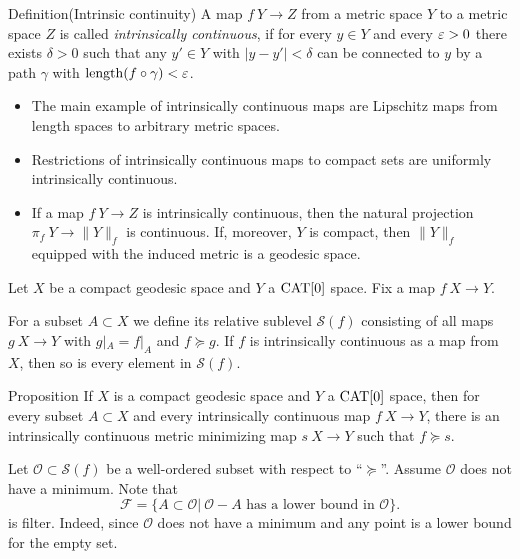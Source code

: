 \documentclass{article}
\begin{document}
\begin{thm}{Definition}(Intrinsic continuity)
A map $f\:Y\to Z$ from a metric space $Y$ to a metric space
 $Z$ is called
{\em intrinsically continuous}, if for every $y\in Y$ 
and every $\varepsilon>0$ there
exists $\delta>0$ such that any  $y'\in Y$
with $|y-y'|<\delta$ can be connected to $y$ by a path $\gamma$ 
with $\mathop{\rm length}\nolimits(f\circ\gamma)<\varepsilon$.
\end{thm}

\begin{itemize}
 \item The main example of intrinsically continuous maps are Lipschitz
maps from length spaces to arbitrary metric spaces.
\item Restrictions of intrinsically continuous maps to compact sets are uniformly intrinsically continuous. %
\item If a map $f\:Y\to Z$ is intrinsically continuous, then 
the natural projection $\pi_f\:Y\rightarrow \|Y\|_f$ is continuous. 
If, moreover, $Y$ is compact, then $\|Y\|_f$ equipped with the induced 
metric is a geodesic space.
\end{itemize}



Let $X$ be a compact geodesic space and $Y$ a $\mathop{\rm CAT}\nolimits[0]$ space. 
Fix a map $f\:X\to Y$.

For a subset $A\subset X$  we 
define its relative sublevel $\mathcal{S}(f)$ consisting of all maps $g\:X\to Y$
with $g|_{A}=f|_{A}$ and $f\succcurlyeq g$. 
If $f$ is intrinsically continuous as a map from $X$, then
so is every element in $\mathcal{S}(f)$. 

\begin{thm}{Proposition}\label{prop:exist}
If $X$ is a compact geodesic space and $Y$ a $\mathop{\rm CAT}\nolimits[0]$ space, then for every subset $A\subset X$ and every intrinsically continuous map $f\:X\rightarrow Y$,
there is an intrinsically continuous  metric minimizing map $s\:X\rightarrow Y$
such that $f\succcurlyeq s$.
\end{thm}


Let $\mathcal{O}\subset\mathcal{S}(f)$ be a well-ordered subset with respect to ``$\succcurlyeq$''. 
Assume $\mathcal{O}$ does not have a minimum.
Note that
$$
\mathcal{F}=\{A\subset\mathcal{O}|\ \mathcal{O}-A\text{ has a lower bound in }\mathcal{O}\}.
$$
is filter.
Indeed, since $\mathcal{O}$ does not have a minimum and any point is a lower bound for the empty set.
\end{document}
